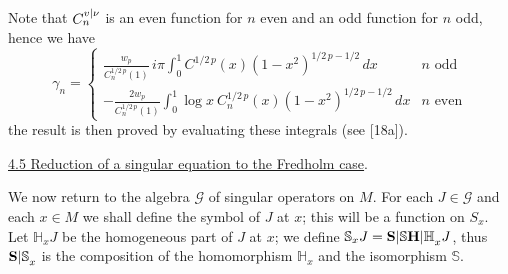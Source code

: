 Note that $C_n^{{v|\nu}}$ is an even function for $n$ even and an odd function for $n$ odd, hence we have
\[
\gamma_n=\begin{cases}
\displaystyle\frac{w_p}{C_n^{1/2\,p}(1)}\,i\pi\int_0^1 C^{1/2\,p}(x)(1-x^2)^{1/2\,p-1/2}\,dx&n\text{ odd}\\[1.5ex]
\displaystyle-\frac{2w_p}{C_n^{1/2\,p}(1)}\int_0^1\log x\ C_n^{1/2\,p}(x)(1-x^2)^{1/2\,p-1/2}\,dx&n\text{ even}
\end{cases}
\]
the result is then proved by evaluating these integrals (see [18a]).

\uline{4.5 Reduction of a singular equation to the Fredholm case}.

We now return to the algebra $\mathcal{G}$ of singular operators on $M$. For each $J\in\mathcal{G}$ and each $x\in M$ we shall define the symbol of $J$ at $x$; this will be a function on $S_x$. Let $\mathbb{H}_xJ$ be the homogeneous part of $J$ at $x$; we define $\mathbb{S}_xJ={\mathbf{S}|\mathbb{S}}{\mathbf{H}|\mathbb{H}}_xJ$, thus ${\mathbf{S}|\mathbb{S}}_x$ is the composition of the homomorphism $\mathbb{H}_x$ and the isomorphism $\mathbb{S}$.


